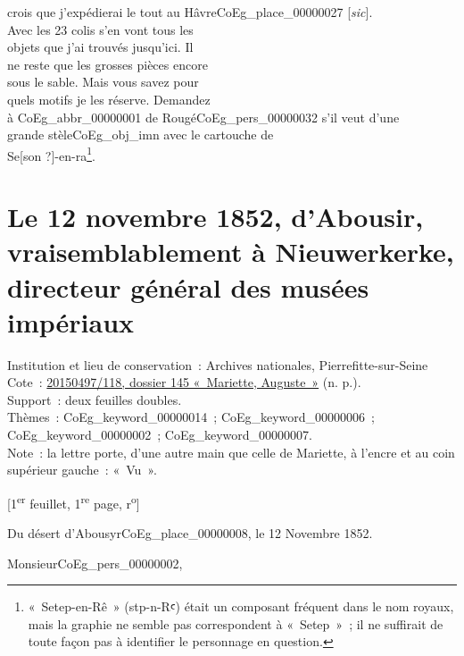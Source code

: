 \documentclass{book}
\begin{document}
crois que j’expédierai le tout au Hâvre\gls{CoEg_place_00000027} {[\textit{sic}]}.\\
Avec les 23 colis s’en vont tous les\\
objets que j’ai trouvés jusqu’ici. Il\\
ne reste que les grosses pièces encore\\
sous le sable. Mais vous savez pour\\
quels motifs je les réserve. Demandez\\
à \gls{CoEg_abbr_00000001} de Rougé\gls{CoEg_pers_00000032} s’il veut d’une\\
grande stèle\gls{CoEg_obj_imn} avec le cartouche de\\
Se{[son ?]}-en-ra\footnote{«~Setep-en-Rê~» (\foreignlanguage{translit}{stp-n-Rꜥ}) était un composant fréquent dans le nom royaux, mais la graphie ne semble pas correspondent à «~Setep~»~; il ne suffirait de toute façon pas à identifier le personnage en question.}.

\hypertarget{CoEg_Mariette_1852-11-12}{}
\section*{Le 12 novembre 1852, d’Abousir, vraisemblablement à Nieuwerkerke, directeur général des musées impériaux}
{\footnotesize
\noindent Institution et lieu de conservation~: Archives nationales, Pierrefitte-sur-Seine\\
Cote~: \hyperlink{CoEg_Mariette_ms_001}{20150497/118, dossier 145 «~Mariette, Auguste~»} (n. p.).\\
Support~: deux feuilles doubles.\\
Thèmes~: \gls{CoEg_keyword_00000014}~; \gls{CoEg_keyword_00000006}~; \gls{CoEg_keyword_00000002}~;  \gls{CoEg_keyword_00000007}.\\
Note~: la lettre porte, d’une autre main que celle de Mariette, à l’encre et au coin supérieur gauche~: «~Vu~».
\begin{center} {[1\textsuperscript{er} feuillet, 1\textsuperscript{re} page, r\textsuperscript{o}]}\end{center}}
\begin{flushright}Du désert d’Abousyr\gls{CoEg_place_00000008}, le 12 Novembre 1852.\end{flushright}

\hspace{1cm}Monsieur\gls{CoEg_pers_00000002},\\
\end{document}

